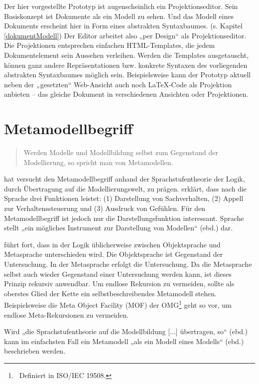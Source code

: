 Der hier vorgestellte Prototyp ist augenscheinlich ein Projektionseditor. Sein Basiskonzept ist Dokumente als ein Modell zu sehen. Und das Modell eines Dokuments erscheint hier in Form eines abstrakten Syntaxbaumes. (s. Kapitel \ref{dokumentModell}) Der Editor arbeitet also „per Design“ als Projektionseditor. Die Projektionen entsprechen einfachen HTML-Templates, die jedem Dokumentelement sein Aussehen verleihen. Werden die Templates ausgetauscht, können ganz andere Repräsentationen bzw. konkrete Syntaxen des vorliegenden abstrakten Syntaxbaumes möglich sein. Beispielsweise kann der Prototyp aktuell neben der „gesetzten“ Web-Ansicht auch noch LaTeX-Code als Projektion anbieten -- das gleiche Dokument in verschiedenen Ansichten oder Projektionen.

 
\section{Metamodellbegriff}\label{}
 
\begin{quote}
 Werden Modelle und Modellbildung selbst zum Gegenstand der Modellierung, so spricht man von Metamodellen. \citep[S.~1]{Strahringer}
\end{quote}
 
\citep{Strahringer} hat versucht den Metamodellbegriff anhand der Sprachstufentheorie der Logik, durch Übertragung auf die Modellierungswelt, zu prägen. \citep[S.~1]{Strahringer} erklärt, dass nach \citep{Buehler} die Sprache drei Funktionen leistet: (1) Darstellung von Sachverhalten, (2) Appell zur Verhaltenssteuerung und (3) Ausdruck von Gefühlen. Für den Metamodellbegriff ist jedoch nur die Darstellungsfunktion interessant. Sprache stellt „ein mögliches Instrument zur Darstellung von Modellen“ (ebd.) dar.

 
\citep[S.~1]{Strahringer} führt fort, dass in der Logik üblicherweise zwischen Objektsprache und Metasprache unterschieden wird. Die Objektsprache ist Gegenstand der Untersuchung. In der Metasprache erfolgt die Untersuchung. Da die Metasprache selbst auch wieder Gegenstand einer Untersuchung werden kann, ist dieses Prinzip rekursiv anwendbar. Um endlose Rekursion zu vermeiden, sollte als oberstes Glied der Kette ein selbstbeschreibendes Metamodell stehen. Beispielsweise die Meta Object Facility (MOF) der OMG\footnote{~Definiert in ISO/IEC 19508.} geht so vor, um endlose Meta-Rekursionen zu vermeiden.

 
Wird „die Sprachstufentheorie auf die Modellbildung [...] übertragen, so“ (ebd.) kann im einfachsten Fall ein Metamodell „als ein Modell eines Modells“ (ebd.) beschrieben werden.

